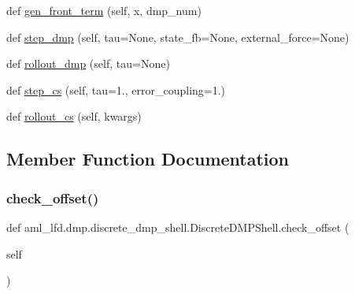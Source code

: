 \begin{DoxyCompactItemize}
\item 
def \hyperlink{classaml__lfd_1_1dmp_1_1discrete__dmp__shell_1_1_discrete_d_m_p_shell_a49cf27ca02e86e1773133835e1f606a2}{gen\+\_\+front\+\_\+term} (self, x, dmp\+\_\+num)
\item 
def \hyperlink{classaml__lfd_1_1dmp_1_1discrete__dmp__shell_1_1_discrete_d_m_p_shell_a198fd652ccf7f3d54a77361f521ca3ae}{step\+\_\+dmp} (self, tau=None, state\+\_\+fb=None, external\+\_\+force=None)
\item 
def \hyperlink{classaml__lfd_1_1dmp_1_1discrete__dmp__shell_1_1_discrete_d_m_p_shell_ad46fa7e783a6c38e19bb6f36fed76a8b}{rollout\+\_\+dmp} (self, tau=None)
\item 
def \hyperlink{classaml__lfd_1_1dmp_1_1discrete__dmp__shell_1_1_discrete_d_m_p_shell_aeff4509250d19885d751a439f3eff8f5}{step\+\_\+cs} (self, tau=1., error\+\_\+coupling=1.)
\item 
def \hyperlink{classaml__lfd_1_1dmp_1_1discrete__dmp__shell_1_1_discrete_d_m_p_shell_a21a2c8cac5774e8dbd87a211fda6ef05}{rollout\+\_\+cs} (self, kwargs)
\end{DoxyCompactItemize}


\subsection{Member Function Documentation}
\hypertarget{classaml__lfd_1_1dmp_1_1discrete__dmp__shell_1_1_discrete_d_m_p_shell_a10cec75150acb1c2e426fc17ce22bde6}{}\label{classaml__lfd_1_1dmp_1_1discrete__dmp__shell_1_1_discrete_d_m_p_shell_a10cec75150acb1c2e426fc17ce22bde6} 
\subsubsection{\texorpdfstring{check\+\_\+offset()}{check\_offset()}}
{\footnotesize\ttfamily def aml\+\_\+lfd.\+dmp.\+discrete\+\_\+dmp\+\_\+shell.\+Discrete\+D\+M\+P\+Shell.\+check\+\_\+offset (\begin{DoxyParamCaption}\item[{}]{self }\end{DoxyParamCaption})}


